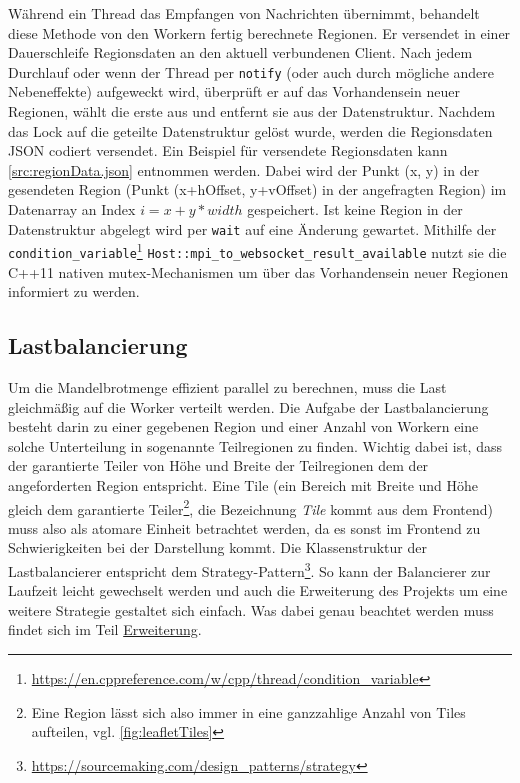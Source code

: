 Während ein Thread das Empfangen von Nachrichten übernimmt, behandelt diese Methode von den Workern fertig berechnete Regionen.
Er versendet in einer Dauerschleife Regionsdaten an den aktuell verbundenen Client.
Nach jedem Durchlauf oder wenn der Thread per \verb|notify| (oder auch durch mögliche andere Nebeneffekte) aufgeweckt wird,
überprüft er auf das Vorhandensein neuer Regionen, wählt die erste aus und entfernt sie aus der Datenstruktur.
Nachdem das Lock auf die geteilte Datenstruktur gelöst wurde, werden die Regionsdaten JSON codiert versendet.
Ein Beispiel für versendete Regionsdaten kann \autoref{src:regionData.json} entnommen werden.
Dabei wird der Punkt (x, y) in der gesendeten Region (Punkt (x+hOffset, y+vOffset) in der angefragten Region)
im Datenarray an Index $i = x + y * width$ gespeichert.
Ist keine Region in der Datenstruktur abgelegt wird per \verb|wait| auf eine Änderung gewartet.
Mithilfe der \verb|condition_variable|\footnote{\url{https://en.cppreference.com/w/cpp/thread/condition_variable}} \verb|Host::mpi_to_websocket_result_available|
nutzt sie die C++11 nativen mutex-Mechanismen um über das Vorhandensein neuer Regionen informiert zu werden.

\begin{figure}
	
\end{figure}

\subsection{Lastbalancierung}\label{sec:load_balancing}
Um die Mandelbrotmenge effizient parallel zu berechnen, muss die Last gleichmäßig auf die Worker verteilt werden.
Die Aufgabe der Lastbalancierung besteht darin zu einer gegebenen Region und einer Anzahl von Workern eine solche Unterteilung in sogenannte Teilregionen zu finden.
Wichtig dabei ist, dass der garantierte Teiler von Höhe und Breite der Teilregionen dem der angeforderten Region entspricht.
Eine Tile (ein Bereich mit Breite und Höhe gleich dem garantierte Teiler\footnote{Eine Region lässt sich also immer in eine ganzzahlige Anzahl von Tiles aufteilen, vgl. \autoref{fig:leafletTiles}}, die Bezeichnung \textit{Tile} kommt aus dem Frontend) muss also als atomare Einheit betrachtet werden, da es sonst im Frontend zu Schwierigkeiten bei der Darstellung kommt.
Die Klassenstruktur der Lastbalancierer entspricht dem Strategy-Pattern\footnote{\url{https://sourcemaking.com/design_patterns/strategy}}. So kann der Balancierer zur Laufzeit leicht gewechselt werden und auch die Erweiterung des Projekts um eine weitere Strategie gestaltet sich einfach.
Was dabei genau beachtet werden muss findet sich im Teil \hyperref[lastbalancierung_erweiterung]{Erweiterung}.


